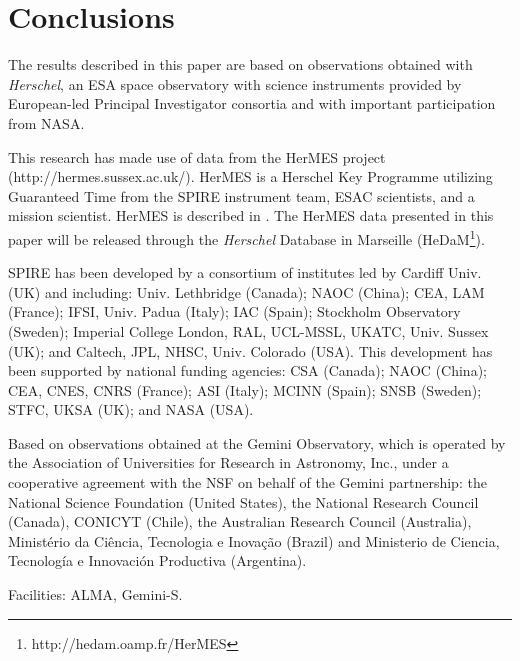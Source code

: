 \documentclass[iop]{emulateapj}
\begin{document}
%



\section{Conclusions} \label{sec:conclusions}


\begin{acknowledgments}

The results described in this paper are based on observations obtained with
{\it Herschel}, an ESA space observatory with science instruments provided by
European-led Principal Investigator consortia and with important participation
from NASA.  

This research has made use of data from the HerMES project
(http://hermes.sussex.ac.uk/). HerMES is a Herschel Key Programme utilizing
Guaranteed Time from the SPIRE instrument team, ESAC scientists, and a mission
scientist. HerMES is described in \citet{Oliver:2012lr}.  The HerMES data
presented in this paper will be released through the {\em Herschel} Database in
Marseille (HeDaM\footnote{http://hedam.oamp.fr/HerMES}).

SPIRE has been developed by a consortium of institutes led by Cardiff Univ.
(UK) and including: Univ. Lethbridge (Canada); NAOC (China); CEA, LAM (France);
IFSI, Univ. Padua (Italy); IAC (Spain); Stockholm Observatory (Sweden);
Imperial College London, RAL, UCL-MSSL, UKATC, Univ. Sussex (UK); and Caltech,
JPL, NHSC, Univ. Colorado (USA). This development has been supported by
national funding agencies: CSA (Canada); NAOC (China); CEA, CNES, CNRS
(France); ASI (Italy); MCINN (Spain); SNSB (Sweden); STFC, UKSA (UK); and NASA
(USA).

Based on observations obtained at the Gemini Observatory, which is operated by
the Association of Universities for Research in Astronomy, Inc., under a
cooperative agreement with the NSF on behalf of the Gemini partnership: the
National Science Foundation (United States), the National Research Council
(Canada), CONICYT (Chile), the Australian Research Council (Australia),
Minist\'erio da Ci\^encia, Tecnologia e Inova\c{c}\~ao (Brazil) and Ministerio
de Ciencia, Tecnolog\'ia e Innovaci\'on Productiva (Argentina).  

Facilities: ALMA, Gemini-S.

\end{acknowledgments}





\end{document}
